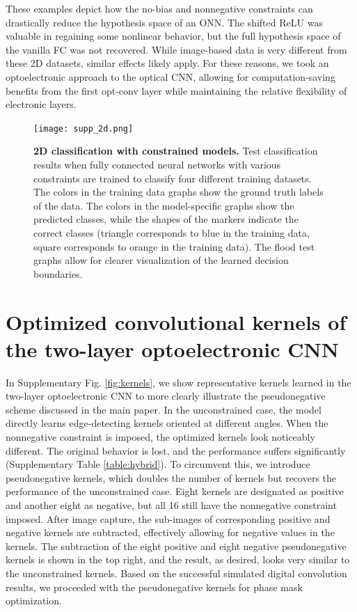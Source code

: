 \documentclass[fleqn,10pt]{wlscirepsupp}
\begin{document}
These examples depict how the no-bias and nonnegative constraints can drastically reduce the hypothesis space of an ONN. The shifted ReLU was valuable in regaining some nonlinear behavior, but the full hypothesis space of the vanilla FC was not recovered. While image-based data is very different from these 2D datasets, similar effects likely apply. For these reasons, we took an optoelectronic approach to the optical CNN, allowing for computation-saving benefits from the first opt-conv layer while maintaining the relative flexibility of electronic layers.

\begin{figure}[htbp]
\centering
\texttt{[image: supp\_2d.png]}
\caption{\textbf{2D classification with constrained models.} Test classification results when fully connected neural networks with various constraints are trained to classify four different training datasets. The colors in the training data graphs show the ground truth labels of the data. The colors in the model-specific graphs show the predicted classes, while the shapes of the markers indicate the correct classes (triangle corresponds to blue in the training data, square corresponds to orange in the training data). The flood test graphs allow for clearer visualization of the learned decision boundaries. }
\label{fig:2d}
\end{figure}



\newpage

\section{Optimized convolutional kernels of the two-layer optoelectronic CNN}

In Supplementary Fig. \ref{fig:kernels}, we show representative kernels learned in the two-layer optoelectronic CNN to more clearly illustrate the pseudonegative scheme discussed in the main paper. In the unconstrained case, the model directly learns edge-detecting kernels oriented at different angles. When the nonnegative constraint is imposed, the optimized kernels look noticeably different. The original behavior is lost, and the performance suffers significantly (Supplementary Table \ref{table:hybrid}). To circumvent this, we introduce pseudonegative kernels, which doubles the number of kernels but recovers the performance of the unconstrained case. Eight kernels are designated as positive and another eight as negative, but all 16 still have the nonnegative constraint imposed. After image capture, the sub-images of corresponding positive and negative kernels are subtracted, effectively allowing for negative values in the kernels. The subtraction of the eight positive and eight negative pseudonegative kernels is shown in the top right, and the result, as desired, looks very similar to the unconstrained kernels. Based on the successful simulated digital convolution results, we proceeded with the pseudonegative kernels for phase mask optimization.
\end{document}
